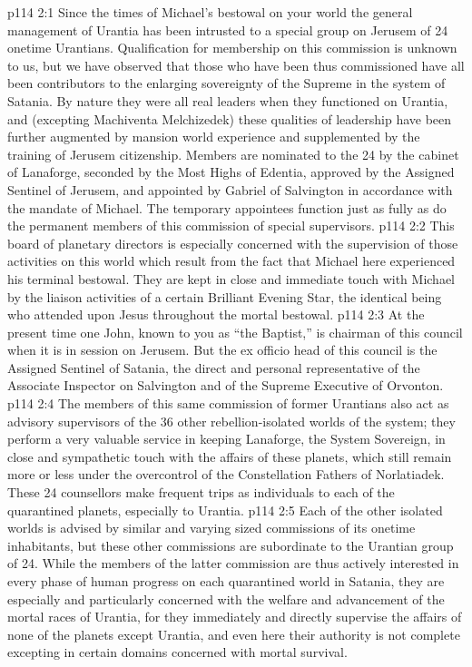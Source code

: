 \vs p114 2:1 Since the times of Michael’s bestowal on your world the general management of Urantia has been intrusted to a special group on Jerusem of 24 onetime Urantians. Qualification for membership on this commission is unknown to us, but we have observed that those who have been thus commissioned have all been contributors to the enlarging sovereignty of the Supreme in the system of Satania. By nature they were all real leaders when they functioned on Urantia, and (excepting Machiventa Melchizedek) these qualities of leadership have been further augmented by mansion world experience and supplemented by the training of Jerusem citizenship. Members are nominated to the 24 by the cabinet of Lanaforge, seconded by the Most Highs of Edentia, approved by the Assigned Sentinel of Jerusem, and appointed by Gabriel of Salvington in accordance with the mandate of Michael. The temporary appointees function just as fully as do the permanent members of this commission of special supervisors.
\vs p114 2:2 This board of planetary directors is especially concerned with the supervision of those activities on this world which result from the fact that Michael here experienced his terminal bestowal. They are kept in close and immediate touch with Michael by the liaison activities of a certain Brilliant Evening Star, the identical being who attended upon Jesus throughout the mortal bestowal.
\vs p114 2:3 At the present time one John, known to you as “the Baptist,” is chairman of this council when it is in session on Jerusem. But the ex officio head of this council is the Assigned Sentinel of Satania, the direct and personal representative of the Associate Inspector on Salvington and of the Supreme Executive of Orvonton.
\vs p114 2:4 The members of this same commission of former Urantians also act as advisory supervisors of the 36 other rebellion\hyp{}isolated worlds of the system; they perform a very valuable service in keeping Lanaforge, the System Sovereign, in close and sympathetic touch with the affairs of these planets, which still remain more or less under the overcontrol of the Constellation Fathers of Norlatiadek. These 24 counsellors make frequent trips as individuals to each of the quarantined planets, especially to Urantia.
\vs p114 2:5 Each of the other isolated worlds is advised by similar and varying sized commissions of its onetime inhabitants, but these other commissions are subordinate to the Urantian group of 24. While the members of the latter commission are thus actively interested in every phase of human progress on each quarantined world in Satania, they are especially and particularly concerned with the welfare and advancement of the mortal races of Urantia, for they immediately and directly supervise the affairs of none of the planets except Urantia, and even here their authority is not complete excepting in certain domains concerned with mortal survival.
